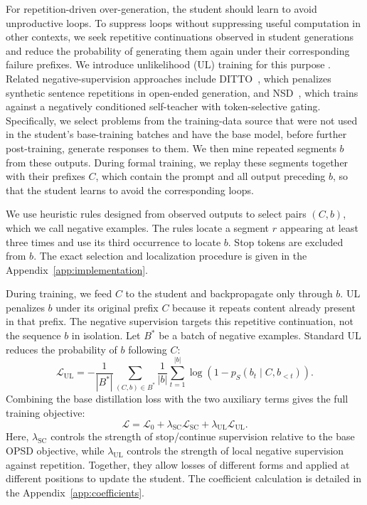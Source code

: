 \documentclass{article} %
\begin{document}
For repetition-driven over-generation, the student should learn to avoid unproductive loops. To suppress loops without suppressing useful computation in other contexts, we seek repetitive continuations observed in student generations and reduce the probability of generating them again under their corresponding failure prefixes. We introduce unlikelihood (UL) training for this purpose \citep{unlikelihood}. Related negative-supervision approaches include DITTO~\citep{ditto}, which penalizes synthetic sentence repetitions in open-ended generation, and NSD~\citep{nsd}, which trains against a negatively conditioned self-teacher with token-selective gating. Specifically, we select problems from the training-data source that were not used in the student's base-training batches and have the base model, before further post-training, generate responses to them. We then mine repeated segments $b$ from these outputs. During formal training, we replay these segments together with their prefixes $C$, which contain the prompt and all output preceding $b$, so that the student learns to avoid the corresponding loops.

We use heuristic rules designed from observed outputs to select pairs $(C,b)$, which we call negative examples. The rules locate a segment $r$ appearing at least three times and use its third occurrence to locate $b$. Stop tokens are excluded from $b$. The exact selection and localization procedure is given in the Appendix~\ref{app:implementation}.

During training, we feed $C$ to the student and backpropagate only through $b$. UL penalizes $b$ under its original prefix $C$ because it repeats content already present in that prefix. The negative supervision targets this repetitive continuation, not the sequence $b$ in isolation. Let $B^*$ be a batch of negative examples. Standard UL reduces the probability of $b$ following $C$:
\begin{equation}
\mathcal L_{\mathrm{UL}}
=
-\frac{1}{|B^*|}
\sum_{(C,b)\in B^*}
\frac{1}{|b|}
\sum_{t=1}^{|b|}
\log\!\left(1-p_S(b_t\mid C,b_{<t})\right).
\label{eq:ul-loss}
\end{equation}
Combining the base distillation loss with the two auxiliary terms gives the full training objective:
\begin{equation}
\mathcal L
=
\mathcal L_0
+
\lambda_{\mathrm{SC}}\mathcal L_{\mathrm{SC}}
+
\lambda_{\mathrm{UL}}\mathcal L_{\mathrm{UL}}.
\label{eq:joint-objective}
\end{equation}
Here, $\lambda_{\mathrm{SC}}$ controls the strength of stop/continue supervision relative to the base OPSD objective, while $\lambda_{\mathrm{UL}}$ controls the strength of local negative supervision against repetition. Together, they allow losses of different forms and applied at different positions to update the student. The coefficient calculation is detailed in the Appendix~\ref{app:coefficients}.
\end{document}
